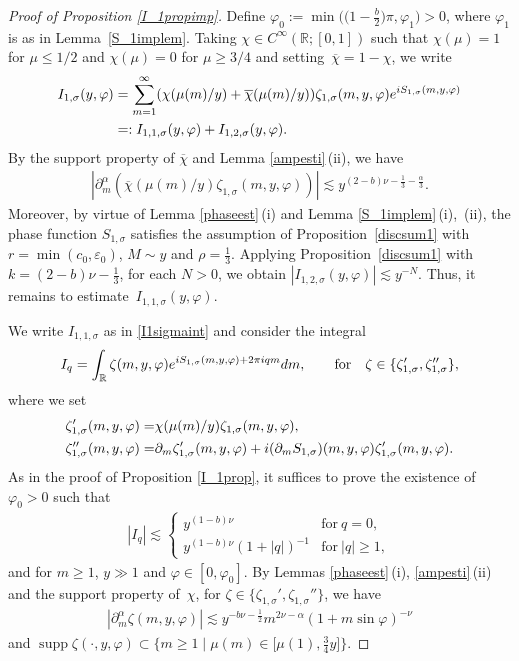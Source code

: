 \documentclass[10pt,a4paper]{article}
\numberwithin{equation}{section}
\def\R{\mathbb{R}}%
\DeclareMathOperator{\supp}{supp}%
\def\a{\alpha}
\def\e{\varepsilon}
\def\f{\varphi}
\def\m{\mu}
\def\n{\nu}
\def\s{\sigma}
\def\z{\zeta}
\def\pa{\partial}
\begin{document}
\begin{proof}[Proof of Proposition \ref{I_1propimp}]
Define $\f_0:=\min\bigl(\bigl(1-\frac{b}{2}\bigr)\pi,\f_1\bigr)>0$, where $\f_1$ is as in Lemma~\ref{S_1implem}.
Taking $\chi\in C^{\infty}(\R;[0,1])$ such that $\chi(\m)=1$ for $\m\leq 1/2$ and $\chi(\m)=0$ for $\m\geq 3/4$ and setting~${\overline{\chi}=1-\chi}$, we write
\begin{align*}
I_{1,\s}(y,\f)&= \sum_{m=1}^{\infty}(\chi(\m(m)/y)+\overline{\chi}(\m(m)/y)) \z_{1,\s}(m,y,\f){\rm e}^{{\rm i}S_{1,\s}(m,y,\f)} \\
&=: I_{1,1,\s}(y,\f)+I_{1,2,\s}(y,\f).
\end{align*}
By the support property of $\overline{\chi}$ and Lemma \ref{ampesti}\,(ii), we have
\begin{align*}
|\pa_{m}^{\a}(\overline{\chi}(\m(m)/y)\z_{1,\s}(m,y,\f))|\lesssim y^{(2-b)\n-\frac{1}{3}-\frac{\a}{3}}.
\end{align*}
Moreover, by virtue of Lemma \ref{phaseest}\,(i) and Lemma \ref{S_1implem}\,(i),~(ii), the phase function $S_{1,\s}$ satisfies the assumption of Proposition~\ref{discsum1} with $r=\min(c_0,\e_0)$, $M\sim y$ and $\rho=\frac{1}{3}$. Applying Proposition~\ref{discsum1} with $k=(2-b)\n-\frac{1}{3}$, for each $N>0$, we obtain $|I_{1,2,\s}(y,\f)|\lesssim y^{-N}$. Thus, it remains to estimate~${I_{1,1,\s}(y,\f)}$.

We write $I_{1,1,\s}$ as in \eqref{I1sigmaint} and consider the integral
\begin{align*}
I_{q}=\int_{\R}\z(m,y,\f){\rm e}^{{\rm i}S_{1,\s}(m,y,\f)+2\pi {\rm i}qm}{\rm d}m, \qquad \text{for}\quad \z\in \{\z_{1,\s}',\z_{1,\s}''\},
\end{align*}
where we set
\begin{align*}
\z'_{1,\s}(m,y,\f)=&\chi(\m(m)/y)\z_{1,\s}(m,y,\f),\\
\z''_{1,\s}(m,y,\f)=&\pa_m\z_{1,\s}'(m,y,\f)+{\rm i}(\pa_mS_{1,\s})(m,y,\f)\z_{1,\s}'(m,y,\f).
\end{align*}
As in the proof of Proposition \ref{I_1prop}, it suffices to prove the existence of $\f_0>0$ such that
\begin{align}\label{I_qest2}
|I_q|\lesssim \begin{cases}
y^{(1-b)\n}& \text{for}\  q=0,\\
y^{(1-b)\n}(1+|q|)^{-1}& \text{for}\  |q|\geq 1,
\end{cases}
\end{align}
and for $m\geq 1$, $y\gg 1$ and $\f\in [0,\f_0]$.
By Lemmas \ref{phaseest}\,(i), \ref{ampesti}\,(ii) and the support property of~$\chi$, for $\z\in\{\z_{1,\s}',\z_{1,\s}''\}$, we have
\begin{align}\label{zetapart2symbolest}
|\pa_m^{\a}\z(m,y,\f)|\lesssim y^{-b\n-\frac{1}{2}}m^{2\n-\a}(1+m\sin \f)^{-\n}
\end{align}
and $\supp \z(\cdot,y,\f)\subset \big\{m\geq 1\mid \m(m)\in \bigl[\m(1),\frac{3}{4}y\bigr]\big\}$.


\end{proof}
\end{document}
